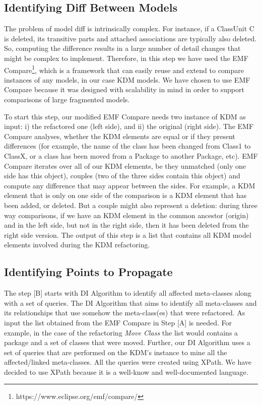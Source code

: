 
\subsection{Identifying Diff Between Models}

The problem of model diff is intrinsically complex. For instance, if a ClassUnit C is deleted, its transitive parts and attached associations are typically also deleted. So, computing the difference results
in a large number of detail changes that might be complex to implement. Therefore, in this step we have used the EMF Compare\footnote{https://www.eclipse.org/emf/compare/}, which is a framework that can easily reuse and extend to compare instances of any models, in our case KDM models. We have chosen to use EMF Compare because it was designed with scalability in mind in order to support comparisons of large fragmented models.

To start this step, our modified EMF Compare needs two instance of KDM as input: i) the refactored one (left side), and ii) the original (right side). The EMF Compare analyses, whether the KDM elements are equal or if they present differences (for example, the name of the class has been changed from Class1 to ClassX, or a class has been moved from a Package to another Package, etc). EMF Compare iterates over all of our KDM elements, be they unmatched (only one side has this object), couples (two of the three sides contain this object) and compute any difference that may appear between the sides. 
For example, a KDM element that is only on one side of the comparison is a KDM element that has been added, or deleted. But a couple might also represent a deletion: during three way comparisons, if we have an KDM element in the common ancestor (origin) and in the left side, but not in the right side, then it has been deleted from the right side version. The output of this step is a list that contains all KDM model elements involved during the KDM refactoring.

\subsection{Identifying Points to Propagate} %
\label{sub:mine_affected_metaclasses}

The step [B] starts with DI Algorithm to identify all affected meta-classes along with a set of queries. The DI Algorithm that aims to identify all meta-classes and its relationships that use somehow the meta-class(es) that were refactored. As input the list obtained from the EMF Compare in Step [A] is needed. For example, in the case of the refactoring \textit{Move Class} the list would contains a package and a set of classes that were moved. Further, our DI Algorithm uses a set of queries that are performed on the KDM's instance to mine all the affected/linked meta-classes. All the queries were created using XPath. We have decided to use XPath because it is a well-know and well-documented language. 

